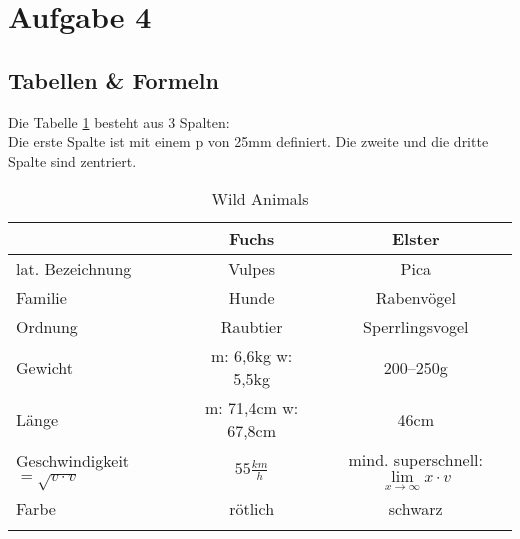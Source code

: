 \documentclass[a4paper, pdftex, ngerman, 11pt]{article}
\begin{document}
\section{Aufgabe 4}
\subsection{Tabellen \& Formeln}
Die Tabelle \ref{tab:ani} besteht aus 3 Spalten:\\
Die erste Spalte ist mit einem p von 25mm definiert. Die zweite und die dritte Spalte sind zentriert.

\begin{longtable}{p{25mm}|c|c}
& Fuchs & Elster\\
\hline
lat. Bezeichnung & Vulpes & Pica\\
\hline
Familie & Hunde & Rabenvögel\\
\hline
Ordnung & Raubtier & Sperrlingsvogel\\
\hline
Gewicht & m: 6,6kg w: 5,5kg & 200--250g\\
\hline
Länge  & m: 71,4cm w: 67,8cm & 46cm\\
\hline
Geschwindigkeit $ = \sqrt{v\cdot v}$ & $55\frac{km}{h}$ & mind. superschnell: $\lim\limits_{x \rightarrow \infty} x \cdot v$ \\
\hline
Farbe & rötlich & schwarz\\
\hline
\caption{Wild Animals}
\label{tab:ani}
\end{longtable}
\end{document}
